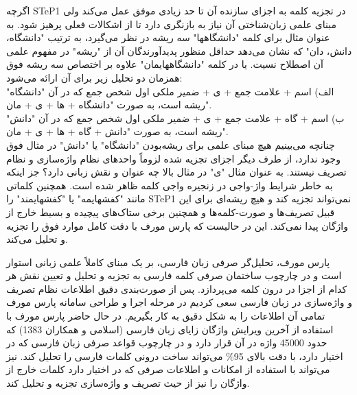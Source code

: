 \documentclass[12pt,onecolumn,a4paper]{article}
\begin{document}
    اگرچه STeP1 در تجزیه کلمه به اجزای سازنده آن تا حد زیادی موفق عمل می‌کند ولی مبنای علمی زبان‌شناختی آن نیاز به بازنگری دارد تا از اشکالات فعلی پرهیز شود. به عنوان مثال برای کلمه "دانشگاهها" سه ریشه در نظر می‌گیرد، به ترتیب "دانشگاه، دانش، دان" که نشان می‌دهد حداقل منظور پدیدآورندگان آن از "ریشه" در مفهوم علمی آن اصطلاح نسیت. یا در کلمه "دانشگاههایمان" علاوه بر اختصاص سه ریشه فوق همزمان دو تحلیل زیر برای آن ارائه می‌شود:\\
    الف) اسم + علامت جمع + ی + ضمیر ملکی اول شخص جمع که در آن "دانشگاه" ریشه است، به صورت "دانشگاه + ها + ی + مان".\\
    ب) اسم + گاه + علامت جمع + ی + ضمیر ملکی اول شخص جمع که در آن "دانش" ریشه است، به صورت "دانش + گاه + ها + ی + مان".\\
    چنانچه می‌بینیم هیچ مبنای علمی برای ریشه‌بودن "دانشگاه" یا "دانش" در مثال فوق وجود ندارد، از طرف دیگر اجزای تجزیه شده لزوماً واحدهای نظام واژه‌سازی و نظام تصریف نیستند. به عنوان مثال "ی" در مثال بالا چه عنوان و نقش زبانی دارد؟ جز اینکه به خاطر شرایط واژ-واجی در زنجیره واجی کلمه ظاهر شده است. همچنین کلماتی مانند "کفشهایمه" یا "کفشهایمند" را STeP1 نمی‌تواند تجزیه کند و هیچ ریشه‌ای برای این قبیل تصریف‌ها و صورت-کلمه‌ها و همچنین برخی ستاک‌های پیچیده و بسیط خارج از واژگان پیدا نمی‌کند. این در حالیست که پارس مورف با دقت کامل موارد فوق را تجزیه و تحلیل می‌کند.
    \par\noindent
    پارس مورف، تحلیل‌گر صرفی زبان فارسی، بر یک مبنای کاملاً علمی زبانی استوار است و در چارچوب ساختمان صرفی کلمه فارسی به تجزیه و تحلیل و تعیین نقش هر کدام از اجزا در درون کلمه می‌پردازد. پس از صورت‌بندی دقیق اطلاعات نظام تصریف و واژه‌سازی در زبان فارسی سعی کردیم در مرحله اجرا و طراحی سامانه پارس مورف تمامی آن اطلاعات را به شکل دقیق به کار بگیریم. در حال حاضر پارس مورف با استفاده از آخرین ویرایش واژگان زایای زبان فارسی (اسلامی و همکاران 1383) که حدود 45000 واژه در آن قرار دارد و در چارچوب قواعد صرفی زبان فارسی که در اختیار دارد، با دقت بالای 95\% می‌تواند ساخت درونی کلمات فارسی را تحلیل کند. نیز می‌تواند با استفاده از امکانات و اطلاعات صرفی که در اختیار دارد کلمات خارج از واژگان را نیز از حیث تصریف و واژه‌سازی تجزیه و تحلیل کند.
    \par\noindent


    \printbibliography[title={منابع}]
\end{document}
